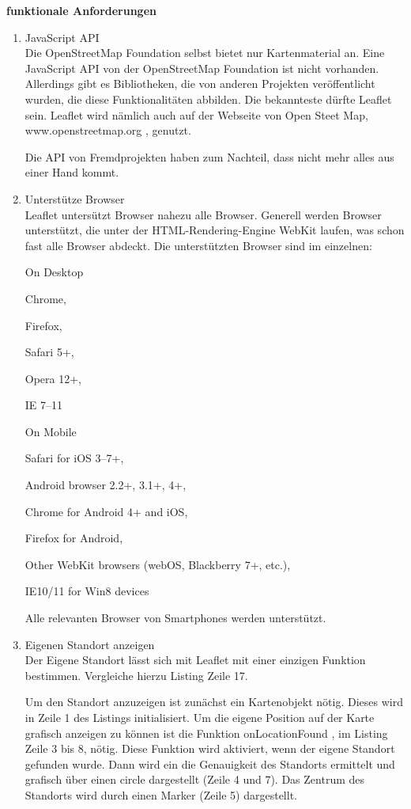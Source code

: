 \textbf{funktionale Anforderungen}
\begin{enumerate}
\item JavaScript API\\
Die OpenStreetMap Foundation selbst bietet nur Kartenmaterial an. Eine JavaScript API von der OpenStreetMap Foundation ist nicht vorhanden. Allerdings gibt es Bibliotheken, die von anderen Projekten veröffentlicht wurden, die diese Funktionalitäten abbilden. Die bekannteste dürfte \glqq Leaflet \grqq sein. Leaflet wird nämlich auch auf der Webseite von Open Steet Map, \glqq www.openstreetmap.org \grqq , genutzt.

Die API von Fremdprojekten haben zum Nachteil, dass nicht mehr alles aus einer Hand kommt.

\item Unterstütze Browser\\
Leaflet untersützt Browser nahezu alle Browser. Generell werden Browser unterstützt, die unter der HTML-Rendering-Engine WebKit laufen, was schon fast alle Browser abdeckt. Die unterstützten Browser sind im einzelnen:

\glqq 
On Desktop

    Chrome,
    
    Firefox,
    
    Safari 5+,
    
    Opera 12+,
    
    IE 7–11

On Mobile

    Safari for iOS 3–7+,
    
    Android browser 2.2+, 3.1+, 4+,
    
    Chrome for Android 4+ and iOS,
    
    Firefox for Android,
    
    Other WebKit browsers (webOS, Blackberry 7+, etc.),
    
    IE10/11 for Win8 devices
\grqq
\cite{leaflet}

Alle relevanten Browser von Smartphones werden unterstützt.

\item Eigenen Standort anzeigen\\
Der Eigene Standort lässt sich mit Leaflet mit einer einzigen Funktion bestimmen. Vergleiche hierzu Listing Zeile 17. 

Um den Standort anzuzeigen ist zunächst ein Kartenobjekt nötig. Dieses wird in Zeile 1 des Listings initialisiert. Um die eigene Position auf der Karte grafisch anzeigen zu können ist die Funktion \glqq onLocationFound  \grqq, im Listing Zeile 3 bis 8,  nötig. Diese Funktion wird aktiviert, wenn der eigene Standort gefunden wurde. Dann wird ein die Genauigkeit des Standorts ermittelt und grafisch über einen circle dargestellt (Zeile 4 und 7). Das Zentrum des Standorts wird durch einen Marker (Zeile 5) dargestellt.


\end{enumerate}

